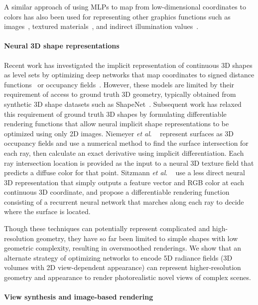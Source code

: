 \documentclass[runningheads]{llncs}
\newcommand{\etal}{\textit{et al}. }
\begin{document}
A similar approach of using MLPs to map from low-dimensional coordinates to colors has also been used for representing other graphics functions such as images~\cite{stanley2007compositional}, textured materials~\cite{henzler20,texturefields,rainer20,rainer19}, and indirect illumination values~\cite{rrf}.

\paragraph{\textbf{Neural 3D shape representations}}

Recent work has investigated the implicit representation of continuous 3D shapes as level sets by optimizing deep networks that map  coordinates to signed distance functions~\cite{jiang2020,deepsdf} or occupancy fields~\cite{genova2020,occupancynet}. However, these models are limited by their requirement of access to ground truth 3D geometry, typically obtained from synthetic 3D shape datasets such as ShapeNet~\cite{shapenet}. 
Subsequent work has relaxed this requirement of ground truth 3D shapes by formulating differentiable rendering functions that allow neural implicit shape representations to be optimized using only 2D images. Niemeyer \etal~\cite{diffvolumetric} represent surfaces as 3D occupancy fields and use a numerical method to find the surface intersection for each ray, then calculate an exact derivative using implicit differentiation. Each ray intersection location is provided as the input to a neural 3D texture field that predicts a diffuse color for that point. Sitzmann \etal~\cite{srn} use a less direct neural 3D representation that simply outputs a feature vector and RGB color at each continuous 3D coordinate, and propose a differentiable rendering function consisting of a recurrent neural network that marches along each ray to decide where the surface is located.

Though these techniques can potentially represent complicated and high-resolution geometry, they have so far been limited to simple shapes with low geometric complexity, resulting in oversmoothed renderings. We show that an alternate strategy of optimizing networks to encode 5D radiance fields (3D volumes with 2D view-dependent appearance) can represent higher-resolution geometry and appearance to render photorealistic novel views of complex scenes.

\paragraph{\textbf{View synthesis and image-based rendering}}
\end{document}
